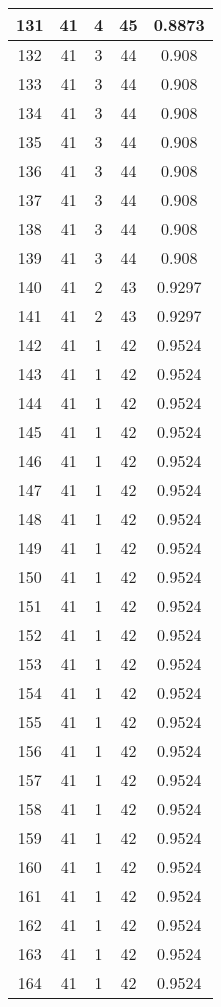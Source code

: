 \documentclass[letterpaper, 12pt]{article}
\begin{document}
\begin{longtable}{|c|c|c|c|c|}
\hline
131 & 41 & 4 & 45 & 0.8873 \\
\hline
132 & 41 & 3 & 44 & 0.908 \\
\hline
133 & 41 & 3 & 44 & 0.908 \\
\hline
134 & 41 & 3 & 44 & 0.908 \\
\hline
135 & 41 & 3 & 44 & 0.908 \\
\hline
136 & 41 & 3 & 44 & 0.908 \\
\hline
137 & 41 & 3 & 44 & 0.908 \\
\hline
138 & 41 & 3 & 44 & 0.908 \\
\hline
139 & 41 & 3 & 44 & 0.908 \\
\hline
140 & 41 & 2 & 43 & 0.9297 \\
\hline
141 & 41 & 2 & 43 & 0.9297 \\
\hline
142 & 41 & 1 & 42 & 0.9524 \\
\hline
143 & 41 & 1 & 42 & 0.9524 \\
\hline
144 & 41 & 1 & 42 & 0.9524 \\
\hline
145 & 41 & 1 & 42 & 0.9524 \\
\hline
146 & 41 & 1 & 42 & 0.9524 \\
\hline
147 & 41 & 1 & 42 & 0.9524 \\
\hline
148 & 41 & 1 & 42 & 0.9524 \\
\hline
149 & 41 & 1 & 42 & 0.9524 \\
\hline
150 & 41 & 1 & 42 & 0.9524 \\
\hline
151 & 41 & 1 & 42 & 0.9524 \\
\hline
152 & 41 & 1 & 42 & 0.9524 \\
\hline
153 & 41 & 1 & 42 & 0.9524 \\
\hline
154 & 41 & 1 & 42 & 0.9524 \\
\hline
155 & 41 & 1 & 42 & 0.9524 \\
\hline
156 & 41 & 1 & 42 & 0.9524 \\
\hline
157 & 41 & 1 & 42 & 0.9524 \\
\hline
158 & 41 & 1 & 42 & 0.9524 \\
\hline
159 & 41 & 1 & 42 & 0.9524 \\
\hline
160 & 41 & 1 & 42 & 0.9524 \\
\hline
161 & 41 & 1 & 42 & 0.9524 \\
\hline
162 & 41 & 1 & 42 & 0.9524 \\
\hline
163 & 41 & 1 & 42 & 0.9524 \\
\hline
164 & 41 & 1 & 42 & 0.9524 \\

\end{longtable}
\end{document}
